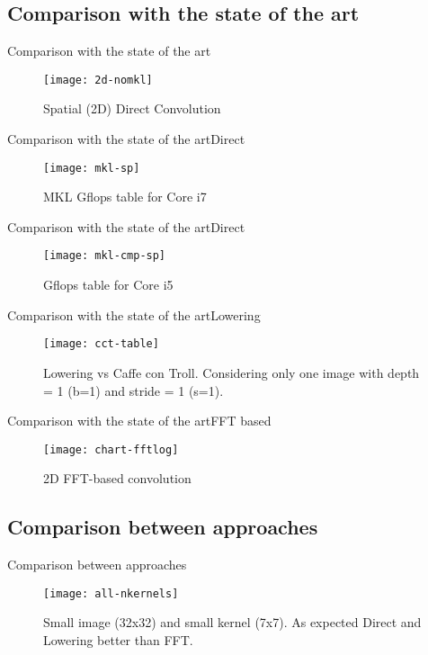 \documentclass{beamer}
\begin{document}
\subsection{Comparison with the state of the art}
\begin{frame}{Comparison with the state of the art}
\begin{figure}[ht] \label{fig1} 
\texttt{[image: 2d-nomkl]}
 \caption{Spatial (2D) Direct Convolution} 
\end{figure}

\end{frame}
\begin{frame}{Comparison with the state of the art}{Direct}
\begin{figure}[ht] \label{fig1} 
\texttt{[image: mkl-sp]}
 \caption{MKL Gflops table for Core i7} 
\end{figure}
\end{frame}

\begin{frame}{Comparison with the state of the art}{Direct}
\begin{figure}[ht] \label{fig1} 
\texttt{[image: mkl-cmp-sp]}
 \caption{Gflops table for Core i5} 
\end{figure}
\end{frame}

\begin{frame}{Comparison with the state of the art}{Lowering}
\begin{figure}[ht] \label{fig1} 
\texttt{[image: cct-table]}
 \caption{Lowering vs Caffe con Troll. Considering only one image with depth = 1 (b=1) and stride = 1 (s=1).} 
\end{figure}
\end{frame}

\begin{frame}{Comparison with the state of the art}{FFT based}
\begin{figure}[htc] \label{fig1} 
\texttt{[image: chart-fftlog]}
 \caption{2D FFT-based convolution} 
\end{figure}
\end{frame}

\subsection{Comparison between approaches}

\begin{frame}{Comparison between approaches}
\begin{figure}[ht] \label{fig1} 
\texttt{[image: all-nkernels]}
 \caption{Small image (32x32) and small kernel (7x7). As expected Direct and Lowering better than FFT.} 
\end{figure}
\end{frame}
\end{document}
